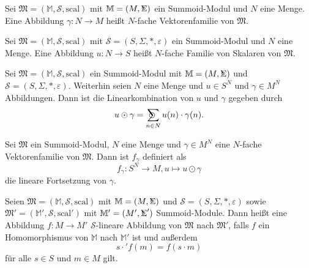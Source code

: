 \documentclass{article}
\DeclareMathOperator*{\Sigmacirc}{%
  \ThisStyle{\mathop{\ensurestackMath{\stackinset{c}{-0.75\LMpt}{c}{}{%
  \rotatebox[origin=lb]{-90}{$\circ$}}{\SavedStyle\Sigma}}}}}
\DeclareMathOperator*{\sumcirc}{%
  \ThisStyle{\mathop{\ensurestackMath{\stackinset{c}{-1.5\LMpt}{c}{}{%
  \rotatebox[origin=lb]{-90}{$\SavedStyle\scalerel*{\bm\Circle}{%
  i}$}}{\SavedStyle\sum}}}}}
\begin{document}
\begin{definition}
  Sei $\mathfrak{M} = (\mathbb{M}, \mathcal{S}, \text{scal})$ mit $\mathbb{M} = (M, \Sigmacirc)$ ein Summoid-Modul und $N$ eine Menge.
  Eine Abbildung $\gamma \colon N \to M$ heißt $N$-fache Vektorenfamilie von $\mathfrak{M}$.
\end{definition}

\begin{definition}
  Sei $\mathfrak{M} = (\mathbb{M}, \mathcal{S}, \text{scal})$ mit $\mathcal{S} = (S, \Sigma, \ast, \varepsilon)$ ein Summoid-Modul und $N$ eine Menge.
  Eine Abbildung $u \colon N \to S$ heißt $N$-fache Familie von Skalaren von $\mathfrak{M}$.
\end{definition}

\begin{definition}
  Sei $\mathfrak{M} = (\mathbb{M}, \mathcal{S}, \text{scal})$ ein Summoid-Modul mit
  $\mathbb{M} = (M, \Sigmacirc)$ und $\mathcal{S} = (S, \Sigma, \ast, \varepsilon)$.
  Weiterhin seien $N$ eine Menge und $u \in S^N$ und $\gamma \in M^N$ Abbildungen.
  Dann ist die Linearkombination von $u$ und $\gamma$ gegeben durch
  \begin{equation*}
    u \odot \gamma = \sumcirc_{n \in N}u(n) \cdot \gamma(n).
  \end{equation*}
\end{definition}

\begin{definition}
  Sei $\mathfrak{M}$ ein Summoid-Modul, $N$ eine Menge und $\gamma \in M^N$ eine $N$-fache Vektorenfamilie von $\mathfrak{M}$.
  Dann ist $f_\gamma$ definiert als
  \begin{equation*}
    f_\gamma \colon S^N \to M, u \mapsto u \odot \gamma
  \end{equation*}
  die lineare Fortsetzung von $\gamma$.
\end{definition}

\begin{definition}
  Seien $\mathfrak{M} = (\mathbb{M}, \mathcal{S}, \text{scal})$
  mit $\mathbb{M} = (M, \Sigmacirc)$
  und $\mathcal{S} = (S, \Sigma, \ast, \varepsilon)$
  sowie $\mathfrak{M}' = (\mathbb{M}', \mathcal{S}, \text{scal}')$
  mit $\mathbb{M}' = (M', \Sigmacirc')$ Summoid-Module.
  Dann heißt eine Abbildung $f \colon M \to M'$ 
  $\mathcal{S}$-lineare Abbildung von $\mathfrak{M}$ nach $\mathfrak{M}'$, 
  falls $f$ ein Homomorphismus von $\mathbb{M}$ nach $\mathbb{M}'$ ist und außerdem
  \begin{equation*}
    s \cdot' f(m) = f(s \cdot m)
  \end{equation*}
  für alle $s \in S$ und $m \in M$ gilt.
\end{definition}
\end{document}
